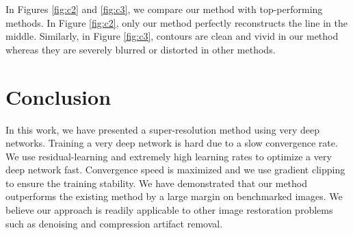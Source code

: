 \documentclass[10pt,twocolumn,letterpaper]{article}
\begin{document}
In Figures \ref{fig:c2} and \ref{fig:c3}, we compare our method with top-performing methods. In Figure \ref{fig:c2}, only our method perfectly reconstructs the line in the middle. Similarly, in Figure \ref{fig:c3}, contours are clean and vivid in our method whereas they are severely blurred or distorted in other methods. 

\section{Conclusion}
In this work, we have presented a super-resolution method using very deep networks. Training a very deep network is hard due to a slow convergence rate. We use residual-learning and extremely high learning rates to optimize a very deep network fast. Convergence speed is maximized and we use gradient clipping to ensure the training stability. We have demonstrated that our method outperforms the existing method by a large margin on benchmarked images. We believe our approach is readily applicable to other image restoration problems such as denoising and compression artifact removal.

{\small
	
	
}
\end{document}

